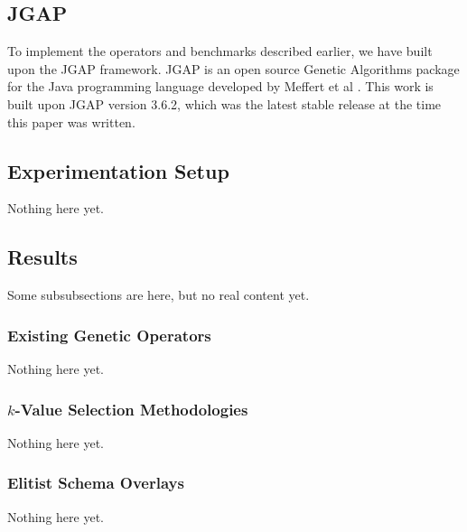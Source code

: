 \subsection*{JGAP}
To implement the operators and benchmarks described earlier, we have built upon the JGAP framework. JGAP is an open source Genetic Algorithms package for the Java programming language developed by Meffert et al \cite{jgap}. This work is built upon JGAP version 3.6.2, which was the latest stable release at the time this paper was written.

\subsection*{Experimentation Setup}
Nothing here yet.

\subsection*{Results}
Some subsubsections are here, but no real content yet.

\subsubsection*{Existing Genetic Operators}
Nothing here yet.

\subsubsection*{$k$-Value Selection Methodologies}
Nothing here yet.

\subsubsection*{Elitist Schema Overlays}
Nothing here yet.
